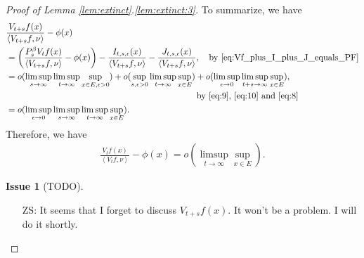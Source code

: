 \documentclass[12pt,a4paper]{amsart}
\numberwithin{equation}{section}
\theoremstyle{plain}
\theoremstyle{definition}
\newtheorem{iss}{Issue}
\begin{document}
\begin{proof}[Proof of Lemma \ref{lem:extinct}.\eqref{lem:extinct:3}]
To summarize, we have
\begin{align}
& \frac{V_{t+s}f(x)}{\left\langle V_{t+s}f,\nu \right\rangle} - \phi(x) 
  \\&= \left(\frac{P_s^\beta V_t f (x)}{\left\langle V_{t+s} f,\nu \right\rangle} - \phi(x)\right) - \frac{I_{t,s,\epsilon}(x)}{\left\langle V_{t+s} f,\nu \right\rangle} -\frac{ J_{t,s,\epsilon}(x)}{\left\langle V_{t+s}f,\nu \right\rangle},\quad\text{by~\eqref{eq:Vf_plus_I_plus_J_equals_PF}}
  \\& \begin{multlined} = o(\limsup_{s\to \infty} \limsup_{t\to \infty} \sup_{x\in E, \epsilon > 0}) + o(\sup_{s,\epsilon>0} \limsup_{t\to \infty} \sup_{x\in E}) + o(\limsup_{\epsilon \to 0} \limsup_{t+s \to \infty} \sup_{x\in E}),
\\ \text{by~\eqref{eq:9}, \eqref{eq:10} and \eqref{eq:8}} \end{multlined}
\\& = o(\limsup_{\epsilon \to 0} \limsup_{s\to \infty}\limsup_{t\to \infty} \sup_{x\in E}). 
\end{align}
Therefore, we have
\begin{align}
\frac{V_{t} f(x)}{\left\langle V_t f,\nu \right\rangle} - \phi(x) 
= o(\limsup_{t\to \infty} \sup_{x\in E}).
\end{align}
\begin{iss}[TODO]~
  \begin{itemize}
  \item[ZS:]
It seems that I forget to discuss $V_{t+s}f(x)$.
It won't be a problem. I will do it shortly.
  \end{itemize}
\end{iss} 
\end{proof}
\end{document}
